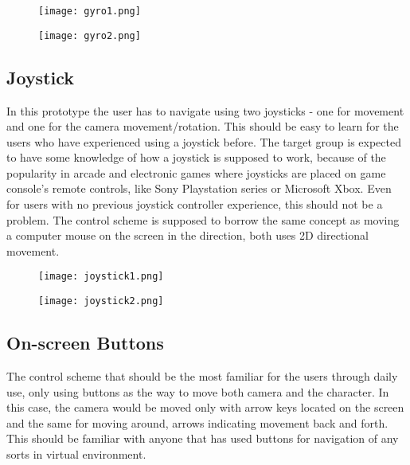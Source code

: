 \begin{figure}[H]
\centering
\begin{minipage}{.5\textwidth}
  \centering
  \texttt{[image: gyro1.png]}
  \label{fig:test1}
\end{minipage}%
\begin{minipage}{.5\textwidth}
  \centering
  \texttt{[image: gyro2.png]}
  \label{fig:test2}
\end{minipage}
\end{figure}


\subsection{Joystick}
In this prototype the user has to navigate using two joysticks - one for movement and one for the camera movement/rotation. This should be easy to learn for the users who have experienced using a joystick before. The target group is expected to have some knowledge of how a joystick is supposed to work, because of the popularity in arcade and electronic games where joysticks are placed on game console's remote controls, like Sony Playstation series or Microsoft Xbox. Even for users with no previous joystick controller experience, this should not be a problem. The control scheme is supposed to borrow the same concept as moving a computer mouse on the screen in the direction, both uses 2D directional movement.

\begin{figure}[H]
\centering
\begin{minipage}{.5\textwidth}
  \centering
  \texttt{[image: joystick1.png]}
\end{minipage}%
\begin{minipage}{.5\textwidth}
  \centering
  \texttt{[image: joystick2.png]}
\end{minipage}
\end{figure}

\subsection{On-screen Buttons}
The control scheme that should be the most familiar for the users through daily use, only using buttons as the way to move both camera and the character. In this case, the camera would be moved only with arrow keys located on the screen and the same for moving around, arrows indicating movement back and forth. This should be familiar with anyone that has used buttons for navigation of any sorts in virtual environment. 

